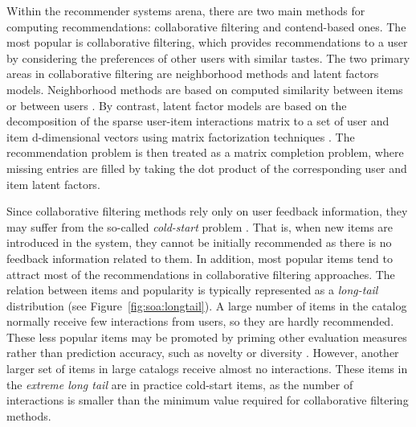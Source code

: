 Within the recommender systems arena, there are two main methods for computing recommendations: collaborative filtering and contend-based ones.
The most popular is collaborative filtering, which provides recommendations to a user by considering the preferences of other users with similar tastes. 
The two primary areas in collaborative filtering are neighborhood methods and latent factors models. Neighborhood methods are based on computed similarity between items or between users \citep{Sarwar2001}. By contrast, latent factor models are based on the decomposition of the sparse user-item interactions matrix to a set of user and item d-dimensional vectors using matrix factorization techniques \citep{Koren2009}. The recommendation problem is then treated as a matrix completion problem, where missing entries are filled by taking the dot product of the corresponding user and item latent factors. %

Since collaborative filtering methods rely only on user feedback information, they may suffer from the so-called \textit{cold-start} problem \citep{Saveski2014}. That is, when new items are introduced in the system, they cannot be initially recommended as there is no feedback information related to them.
In addition, most popular items tend to attract most of the recommendations in collaborative filtering approaches. The relation between items and popularity is typically represented as a \textit{long-tail} distribution \citep{anderson2006long} (see Figure~\ref{fig:soa:longtail}). A large number of items in the catalog normally receive few interactions from users, so they are hardly recommended. %
These less popular items may be promoted by priming other evaluation measures rather than prediction accuracy, such as novelty or diversity \citep{abdollahpouri2017controlling}.
However, another larger set of items in large catalogs receive almost no interactions. These items in the \textit{extreme long tail} are in practice cold-start items, as the number of interactions is smaller than the minimum value required for collaborative filtering methods.

